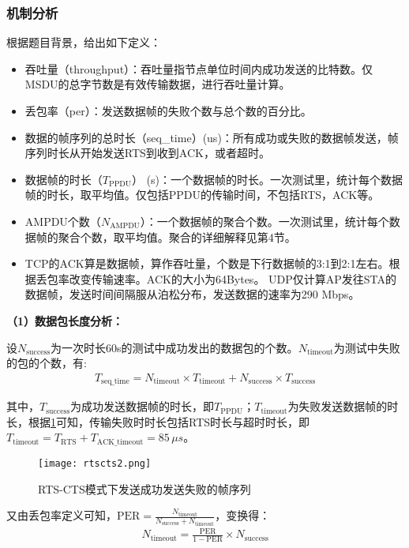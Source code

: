\documentclass[bwprint]{gmcmthesis}
\begin{document}
\subsubsection{机制分析}

根据题目背景，给出如下定义：
\begin{itemize}
    \item 吞吐量（throughput）：吞吐量指节点单位时间内成功发送的比特数。仅MSDU的总字节数是有效传输数据，进行吞吐量计算。
    \item 丢包率（per）：发送数据帧的失败个数与总个数的百分比。
    \item 数据的帧序列的总时长（seq\_time）(us)：所有成功或失败的数据帧发送，帧序列时长从开始发送RTS到收到ACK，或者超时。
    \item 数据帧的时长（$T_{\text{PPDU}}$） (s)：一个数据帧的时长。一次测试里，统计每个数据帧的时长，取平均值。仅包括PPDU的传输时间，不包括RTS，ACK等。
    \item AMPDU个数（$N_{\text{AMPDU}}$）：一个数据帧的聚合个数。一次测试里，统计每个数据帧的聚合个数，取平均值。聚合的详细解释见第4节。
    \item TCP的ACK算是数据帧，算作吞吐量，个数是下行数据帧的3:1到2:1左右。根据丢包率改变传输速率。ACK的大小为64Bytes。
    UDP仅计算AP发往STA的数据帧，发送时间间隔服从泊松分布，发送数据的速率为290 Mbps。
\end{itemize}

\textbf{（1）数据包长度分析：}

设$N_{\text{success}}$为一次时长60s的测试中成功发出的数据包的个数。$N_{\text{timeout}}$为测试中失败的包的个数，有:
\begin{align}
    T_{\text{seq\_time}} = N_{\text{timeout}} \times T_{\text{timeout}} + N_{\text{success}} \times T_{\text{success}} \label{eq:seq_time}
    \end{align}

其中，$T_{\text{success}}$为成功发送数据帧的时长，即$T_{\text{PPDU}}$；$T_{\text{timeout}}$为失败发送数据帧的时长，根据\ref{pho:rtscts2}可知，传输失败时时长包括RTS时长与超时时长，即$T_{\text{timeout}} = T_{\text{RTS}} + T_{\text{ACK\_timeout}} = 85 \, \mu s$。

\begin{figure}[!htbp]
    \centering
    \texttt{[image: rtscts2.png]}
    \caption{\centering RTS-CTS模式下发送成功发送失败的帧序列}
    \label{pho:rtscts2}
\end{figure}

又由丢包率定义可知，$\text{PER} = \frac{N_{\text{timeout}}}{N_{\text{success}}+N_{\text{timeout}}}$，变换得：
\begin{align}
    N_{\text{timeout}} = \frac{\text{PER}}{1-\text{PER}} \times N_{\text{success}} \label{eq:y}
    \end{align}
\end{document}
